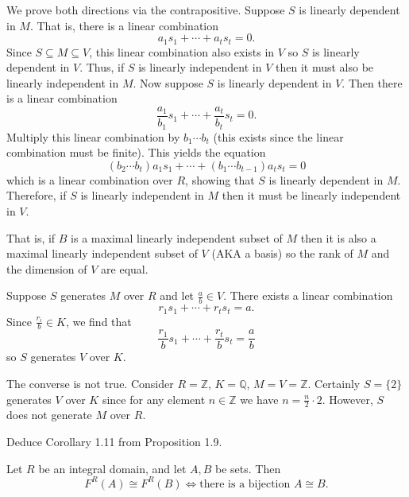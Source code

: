 \documentclass[../../master.tex]{subfiles}
\begin{document}
\begin{solution}
    We prove both directions via the contrapositive.
    Suppose $S$ is linearly dependent in $M$.
    That is, there is a linear combination
    \[
    a_1 s_1 + \cdots + a_t s_t = 0.
    \]
    Since $S \subseteq M \subseteq V$, this linear combination also exists in $V$ so $S$ is linearly dependent in $V$.
    Thus, if $S$ is linearly independent in $V$ then it must also be linearly independent in $M$.
    Now suppose $S$ is linearly dependent in $V$.
    Then there is a linear combination
    \[
    \frac{a_1}{b_1} s_1 + \cdots + \frac{a_t}{b_t} s_t = 0.
    \]
    Multiply this linear combination by $b_1 \cdots b_t$ (this exists since the linear combination must be finite).
    This yields the equation
    \[
        (b_2 \cdots b_t) a_1 s_1 + \cdots + (b_1 \cdots b_{t-1}) a_t s_t = 0
    \]
    which is a linear combination over $R$, showing that $S$ is linearly dependent in $M$.
    Therefore, if $S$ is linearly independent in $M$ then it must be linearly independent in $V$.

    That is, if $B$ is a maximal linearly independent subset of $M$ then it is also a maximal linearly independent subset of $V$ (AKA a basis) so the rank of $M$ and the dimension of $V$ are equal.

    Suppose $S$ generates $M$ over $R$ and let $\frac{a}{b} \in V$.
    There exists a linear combination
    \[
    r_1 s_1 + \cdots + r_t s_t = a.
    \]
    Since $\frac{r_i}{b} \in K$, we find that 
    \[
    \frac{r_1}{b} s_1 + \cdots + \frac{r_t}{b} s_t = \frac{a}{b}
    \]
    so $S$ generates $V$ over $K$.

    The converse is not true.
    Consider $R = \mathbb{Z}$, $K = \mathbb{Q}$, $M = V = \mathbb{Z}$.
    Certainly $S = \{2\}$ generates $V$ over $K$ since for any element $n \in \mathbb{Z}$ we have $n = \frac{n}{2} \cdot 2$.
    However, $S$ does not generate $M$ over $R$.
\end{solution}

\begin{problem}
    Deduce Corollary 1.11 from Proposition 1.9.
    \begin{proposition}[Corollary 1.11] 
        Let $R$ be an integral domain, and let $A, B$ be sets.
        Then
        \[
            F^{R}(A) \cong F^{R}(B) \Longleftrightarrow \text{there is a bijection $A \cong B$.}
        \]
    \end{proposition}
\end{problem}
\end{document}
